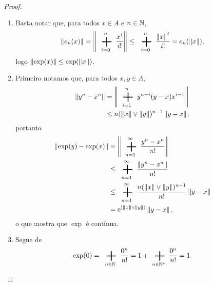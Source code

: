 \begin{proof}
	\begin{enumerate}
	\item Basta notar que, para todos $x \in A$ e $n \in \mathbb{N}$,
		\begin{equation*}
		\nor{e_n(x)} = \nor{\sum_{i=0}^{n} \frac{x^i}{i!}} \leq \sum_{i=0}^{n} \frac{\nor{x}^i}{i!} = e_n(\nor{x}),
		\end{equation*}
logo $\left\Vert{\exp(x)}\right\Vert \leq \exp(\left\Vert{x}\right\Vert)$.

	\item Primeiro notamos que, para todos $x,y \in A$,
		\begin{align*}
		\nor{y^n-x^n} &= \nor{\sum_{i=1}^{n} y^{n-i}(y-x)x^{i-1}} \\
			&\leq n(\nor{x} \opmax \nor{y})^{n-1}\nor{y-x},
		\end{align*}
portanto
	\begin{align*}
	\nor{\exp(y) - \exp(x)} &= \nor{\sum_{n=1}^\infty \frac{y^n-x^n}{n!}} \\
		&\leq \sum_{n=1}^\infty \frac{\nor{y^n-x^n}}{n!} \\
		&\leq \sum_{n=1}^\infty \frac{n(\nor{x} \opmax \nor{y})^{n-1}}{n!} \nor{y-x} \\
		&= \e^{(\nor{x} \opmax \nor{y})}\nor{y-x},
	\end{align*}
o que mostra que $\exp$ é contínua.

	\item Segue de
		\begin{equation*}
		\exp(0) = \sum_{n \in \N} \frac{0^n}{n!} = 1 + \sum_{n \in \N^*} \frac{0^n}{n!} = 1.
		\end{equation*}


\end{enumerate}
\end{proof}
